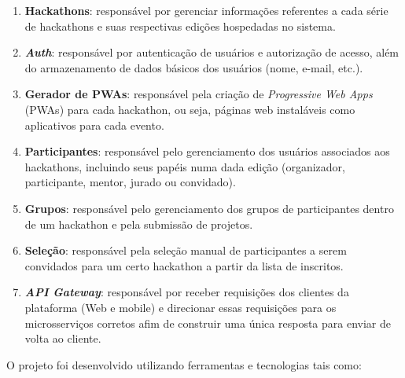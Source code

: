 \documentclass[10pt,twoside,a4paper]{article}
\begin{document}
    \begin{enumerate}
        \item \textbf{Hackathons}: responsável por gerenciar informações referentes a cada série de hackathons e suas respectivas edições hospedadas no sistema.
        
        \item \textbf{\textit{Auth}}: responsável por autenticação de usuários e autorização de acesso, além do armazenamento de dados básicos dos usuários (nome, e-mail, etc.).
        
        \item \textbf{Gerador de PWAs}: responsável pela criação de \textit{Progressive Web Apps} (PWAs) para cada hackathon, ou seja, páginas web instaláveis como aplicativos para cada evento.
        
         \item \textbf{Participantes}: responsável pelo gerenciamento dos usuários associados aos hackathons, incluindo seus papéis numa dada edição (organizador, participante, mentor, jurado ou convidado).
         
         \item \textbf{Grupos}: responsável pelo gerenciamento dos grupos de participantes dentro de um hackathon e pela submissão de projetos.
         
         \item \textbf{Seleção}: responsável pela seleção manual de participantes a serem convidados para um certo hackathon a partir da lista de inscritos.
         
         \item \textbf{\textit{API Gateway}}: responsável por receber requisições dos clientes da plataforma (Web e mobile) e direcionar essas requisições para os microsserviços corretos afim de construir uma única resposta para enviar de volta ao cliente.
    \end{enumerate}
    
    O projeto foi desenvolvido utilizando ferramentas e tecnologias tais como:
    
\end{document}
